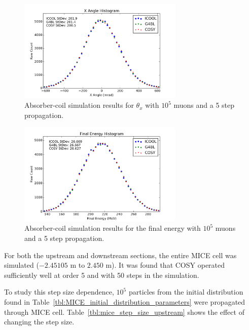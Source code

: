 \begin{figure}[H]
  \centering
    \includegraphics[width=0.7\textwidth]{MICE data/absorber coils/px} 
  \caption{Absorber-coil simulation results for $\theta_x$ with $10^5$ muons and a 5 step propagation.}
  \label{fig:acpx}
\end{figure}

\begin{figure}[H]
  \centering
    \includegraphics[width=0.7\textwidth]{MICE data/absorber coils/e} 
  \caption{Absorber-coil simulation results for the final energy with $10^5$ muons and a 5 step propagation.}
  \label{fig:ace}
\end{figure}

For both the upstream and downstream sections, the entire MICE cell was simulated ($-2.45105$ m to $2.450$ m). It was found that COSY operated sufficiently well at order 5 and with 50 steps in the simulation.

To study this step size dependence, $10^5$ particles from the initial distribution found in Table~\ref{tbl:MICE_initial_distribution_parameters} were propagated through MICE cell. Table~\ref{tbl:mice_step_size_upstream} shows the effect of changing the step size.

